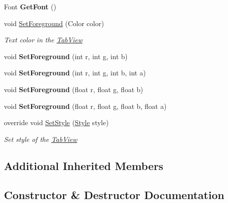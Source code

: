 \begin{DoxyCompactItemize}
Font {\bfseries Get\+Font} ()
\item 
void \mbox{\hyperlink{class_space_v_i_l_1_1_tab_view_a7a25297eecbcf09382c2752cd92d1244}{Set\+Foreground}} (Color color)
\begin{DoxyCompactList}\small\item\em Text color in the \mbox{\hyperlink{class_space_v_i_l_1_1_tab_view}{Tab\+View}} \end{DoxyCompactList}\item 
\mbox{\label{class_space_v_i_l_1_1_tab_view_a3e81b2cf9db21ac1c8a867391017fdca}} 
void {\bfseries Set\+Foreground} (int r, int g, int b)
\item 
\mbox{\label{class_space_v_i_l_1_1_tab_view_ae9f11aee9f6bf28788f7beadcf6ce6ad}} 
void {\bfseries Set\+Foreground} (int r, int g, int b, int a)
\item 
\mbox{\label{class_space_v_i_l_1_1_tab_view_ae018987f10e86c784e8434aeabce97ad}} 
void {\bfseries Set\+Foreground} (float r, float g, float b)
\item 
\mbox{\label{class_space_v_i_l_1_1_tab_view_a16a4832beb15a247519bc08be744583e}} 
void {\bfseries Set\+Foreground} (float r, float g, float b, float a)
\item 
override void \mbox{\hyperlink{class_space_v_i_l_1_1_tab_view_a02e2484cd3a31eb4d794a138981e3fa7}{Set\+Style}} (\mbox{\hyperlink{class_space_v_i_l_1_1_decorations_1_1_style}{Style}} style)
\begin{DoxyCompactList}\small\item\em Set style of the \mbox{\hyperlink{class_space_v_i_l_1_1_tab_view}{Tab\+View}} \end{DoxyCompactList}\end{DoxyCompactItemize}
\subsection*{Additional Inherited Members}


\subsection{Constructor \& Destructor Documentation}
\mbox{\label{class_space_v_i_l_1_1_tab_view_ade6f178694207c08c008d3caee32dcd5}} 
